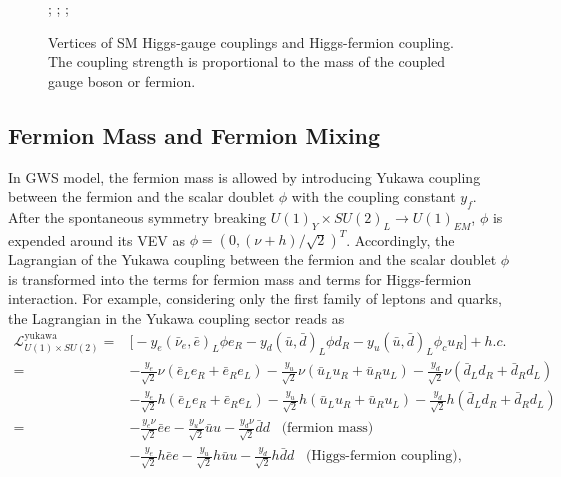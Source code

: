 \begin{figure}[ht]
    \centering
    ; \qquad
    ; \qquad 
    ; \qquad 
    \caption{Vertices of SM Higgs-gauge couplings and Higgs-fermion coupling. The coupling strength is proportional to the mass of the coupled gauge boson or fermion. }
    \label{fig:physics:qft:ewHiggsGaugeCoupling}
\end{figure}


\subsection{Fermion Mass and Fermion Mixing}

In GWS model, the fermion mass is allowed by introducing Yukawa coupling between the fermion and the scalar doublet $\phi$ with the coupling constant $y_f$. After the spontaneous symmetry breaking $U(1)_Y \times SU(2)_L \to U(1)_{EM}$, $\phi$ is expended around its VEV as $\phi=(0, (\nu+h)/\sqrt{2})^T$. Accordingly, the Lagrangian of the Yukawa coupling between the fermion and the scalar doublet $\phi$ is transformed into the terms for fermion mass and terms for Higgs-fermion interaction. For example, considering only the first family of leptons and quarks, the Lagrangian in the Yukawa coupling sector reads as
\begin{equation}
\begin{split}
	 \mathcal{L}_{U(1)\times SU(2)}^{\text{yukawa}} =& \big[ -y_e (\bar{\nu}_e,\bar{e})_L \phi e_R  -y_d (\bar{u},\bar{d})_L \phi d_R - y_u(\bar{u},\bar{d})_L \phi_c u_R \big ] + h.c. \\
     = & -\frac{y_e}{\sqrt{2}}\nu(\bar{e}_L e_R + \bar{e}_R e_L)   -\frac{y_u}{\sqrt{2}}\nu(\bar{u}_L u_R + \bar{u}_R u_L)  -\frac{y_d}{\sqrt{2}}\nu(\bar{d}_L d_R + \bar{d}_R d_L)  \\
     & -\frac{y_e}{\sqrt{2}}h(\bar{e}_L e_R + \bar{e}_R e_L)  - \frac{y_u}{\sqrt{2}}h(\bar{u}_L u_R + \bar{u}_R u_L)  - \frac{y_d}{\sqrt{2}}h(\bar{d}_L d_R + \bar{d}_R d_L)  \\
     = & -\frac{y_e\nu}{\sqrt{2}}\bar{e} e   -\frac{y_u\nu}{\sqrt{2}}\bar{u}u -\frac{y_d\nu}{\sqrt{2}} \bar{d} d \;\;\; \text{(fermion mass)} \\
     & -\frac{y_e}{\sqrt{2}}h\bar{e} e   -\frac{y_u}{\sqrt{2}}h\bar{u}u -\frac{y_d}{\sqrt{2}} h \bar{d} d \;\;\; \text{(Higgs-fermion coupling)},
\end{split}
\label{eqn:physics:qft:gws:yukawaLagragian}
\end{equation}


